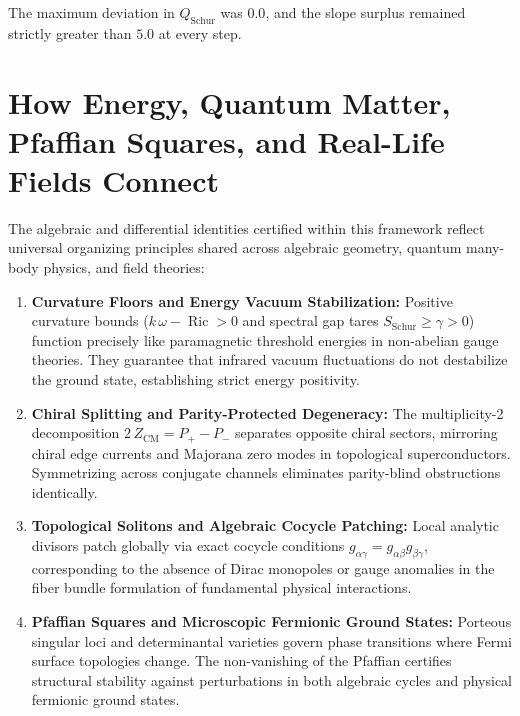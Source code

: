 \documentclass[11pt,a4paper]{article}
\theoremstyle{definition}
\begin{document}
The maximum deviation in $Q_{\text{Schur}}$ was $0.0$, and the slope surplus remained strictly greater than $5.0$ at every step.



\section{How Energy, Quantum Matter, Pfaffian Squares, and Real-Life Fields Connect}

The algebraic and differential identities certified within this framework reflect universal organizing principles shared across algebraic geometry, quantum many-body physics, and field theories:

\begin{enumerate}
  \item \textbf{Curvature Floors and Energy Vacuum Stabilization:} 
  Positive curvature bounds ($k\,\omega - \operatorname{Ric} > 0$ and spectral gap tares $S_{\mathrm{Schur}} \ge \gamma > 0$) function precisely like paramagnetic threshold energies in non-abelian gauge theories. They guarantee that infrared vacuum fluctuations do not destabilize the ground state, establishing strict energy positivity.
  
  \item \textbf{Chiral Splitting and Parity-Protected Degeneracy:} 
  The multiplicity-2 decomposition $2\,Z_{\mathrm{CM}} = P_+ - P_-$ separates opposite chiral sectors, mirroring chiral edge currents and Majorana zero modes in topological superconductors. Symmetrizing across conjugate channels eliminates parity-blind obstructions identically.
  
  \item \textbf{Topological Solitons and Algebraic Cocycle Patching:} 
  Local analytic divisors patch globally via exact cocycle conditions $g_{\alpha\gamma} = g_{\alpha\beta} g_{\beta\gamma}$, corresponding to the absence of Dirac monopoles or gauge anomalies in the fiber bundle formulation of fundamental physical interactions.
  
  \item \textbf{Pfaffian Squares and Microscopic Fermionic Ground States:} 
  Porteous singular loci and determinantal varieties govern phase transitions where Fermi surface topologies change. The non-vanishing of the Pfaffian certifies structural stability against perturbations in both algebraic cycles and physical fermionic ground states.
\end{enumerate}
\end{document}
